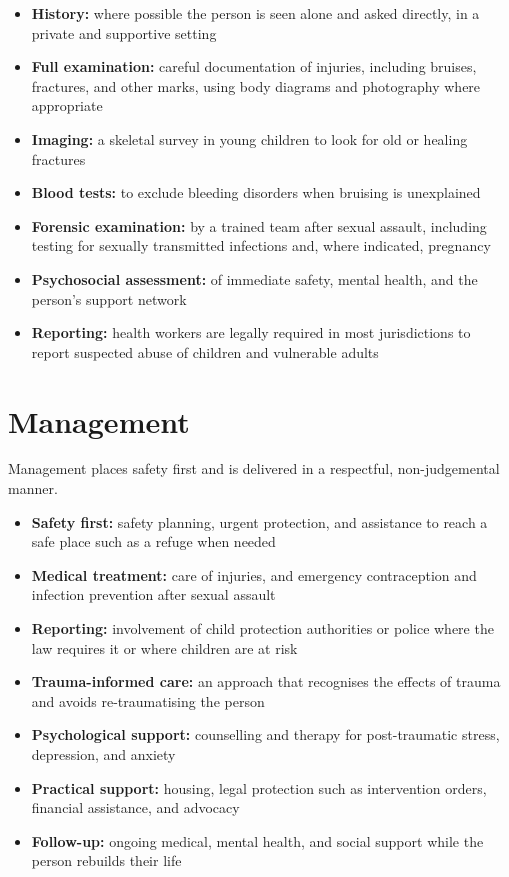 \begin{itemize}
    \item \textbf{History:} where possible the person is seen alone and asked directly, in a private and supportive setting
    \item \textbf{Full examination:} careful documentation of injuries, including bruises, fractures, and other marks, using body diagrams and photography where appropriate
    \item \textbf{Imaging:} a skeletal survey in young children to look for old or healing fractures
    \item \textbf{Blood tests:} to exclude bleeding disorders when bruising is unexplained
    \item \textbf{Forensic examination:} by a trained team after sexual assault, including testing for sexually transmitted infections and, where indicated, pregnancy
    \item \textbf{Psychosocial assessment:} of immediate safety, mental health, and the person's support network
    \item \textbf{Reporting:} health workers are legally required in most jurisdictions to report suspected abuse of children and vulnerable adults
\end{itemize}

\section*{Management}
Management places safety first and is delivered in a respectful, non-judgemental manner.

\begin{itemize}
    \item \textbf{Safety first:} safety planning, urgent protection, and assistance to reach a safe place such as a refuge when needed
    \item \textbf{Medical treatment:} care of injuries, and emergency contraception and infection prevention after sexual assault
    \item \textbf{Reporting:} involvement of child protection authorities or police where the law requires it or where children are at risk
    \item \textbf{Trauma-informed care:} an approach that recognises the effects of trauma and avoids re-traumatising the person
    \item \textbf{Psychological support:} counselling and therapy for post-traumatic stress, depression, and anxiety
    \item \textbf{Practical support:} housing, legal protection such as intervention orders, financial assistance, and advocacy
    \item \textbf{Follow-up:} ongoing medical, mental health, and social support while the person rebuilds their life
\end{itemize}


